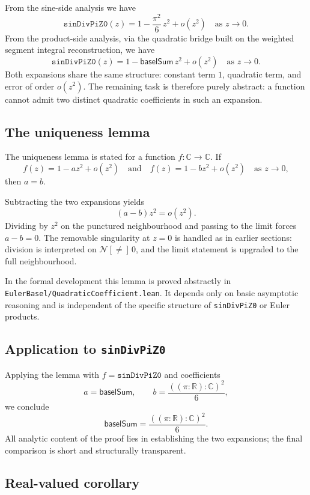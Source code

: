 \documentclass[11pt,a4paper]{article}
\theoremstyle{plain}
\theoremstyle{definition}
\DeclareRobustCommand{\codepath}[1]{\nolinkurl{#1}}
\newcommand{\C}{\ensuremath{\mathbb{C}}}
\newcommand{\nhdsPunct}[1]{\ensuremath{\mathcal{N}[{\neq}]\,#1}}
\DeclareRobustCommand{\leanid}[1]{\texttt{#1}}
\DeclareRobustCommand{\codepath}[1]{\nolinkurl{#1}}
\newcommand{\baselSum}{\ensuremath{\mathsf{baselSum}}}
\newcommand{\sinDivPiZZero}{\leanid{sinDivPiZ0}}
\begin{document}
From the sine-side analysis we have
\[
\sinDivPiZZero(z)
=
1 - \frac{\pi^{2}}{6}\, z^{2} + o(z^{2})
\quad
\text{as } z \to 0.
\]
From the product-side analysis, via the quadratic bridge built on the weighted segment integral reconstruction, we have
\[
\sinDivPiZZero(z)
=
1 - \baselSum\, z^{2} + o(z^{2})
\quad
\text{as } z \to 0.
\]
Both expansions share the same structure: constant term \(1\), quadratic term, and error of order \(o(z^{2})\). The remaining task is therefore purely abstract: a function cannot admit two distinct quadratic coefficients in such an expansion.

\subsection{The uniqueness lemma}

The uniqueness lemma is stated for a function \(f : \C \to \C\). If
\[
f(z) = 1 - a z^{2} + o(z^{2})
\quad
\text{and}
\quad
f(z) = 1 - b z^{2} + o(z^{2})
\quad
\text{as } z \to 0,
\]
then \(a = b\).

Subtracting the two expansions yields
\[
(a-b) z^{2} = o(z^{2}).
\]
Dividing by \(z^{2}\) on the punctured neighbourhood and passing to the limit forces \(a-b = 0\). The removable singularity at \(z=0\) is handled as in earlier sections: division is interpreted on \(\nhdsPunct{0}\), and the limit statement is upgraded to the full neighbourhood.

In the formal development this lemma is proved abstractly in \codepath{EulerBasel/QuadraticCoefficient.lean}. It depends only on basic asymptotic reasoning and is independent of the specific structure of \sinDivPiZZero{} or Euler products.

\subsection{Application to \sinDivPiZZero}

Applying the lemma with \(f = \sinDivPiZZero\) and coefficients
\[
a = \baselSum,
\qquad
b = \frac{((\pi : \mathbb{R}) : \mathbb{C})^{2}}{6},
\]
we conclude
\[
\baselSum = \frac{((\pi : \mathbb{R}) : \mathbb{C})^{2}}{6}.
\]
All analytic content of the proof lies in establishing the two expansions; the final comparison is short and structurally transparent.

\subsection{Real-valued corollary}
\end{document}
